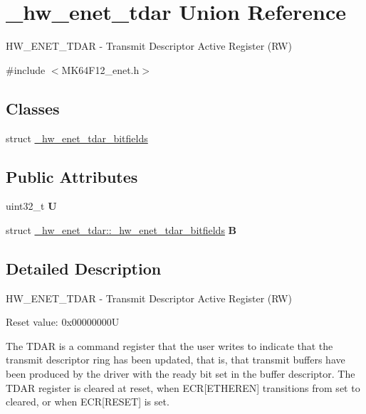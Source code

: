 \hypertarget{union__hw__enet__tdar}{}\section{\+\_\+hw\+\_\+enet\+\_\+tdar Union Reference}
\label{union__hw__enet__tdar}


H\+W\+\_\+\+E\+N\+E\+T\+\_\+\+T\+D\+AR -\/ Transmit Descriptor Active Register (RW)  




{\ttfamily \#include $<$M\+K64\+F12\+\_\+enet.\+h$>$}

\subsection*{Classes}
\begin{DoxyCompactItemize}
\item 
struct \hyperlink{struct__hw__enet__tdar_1_1__hw__enet__tdar__bitfields}{\+\_\+hw\+\_\+enet\+\_\+tdar\+\_\+bitfields}
\end{DoxyCompactItemize}
\subsection*{Public Attributes}
\begin{DoxyCompactItemize}
\item 
uint32\+\_\+t {\bfseries U}\hypertarget{union__hw__enet__tdar_a3fa9a50607c605f86243030ebfa4b5a1}{}\label{union__hw__enet__tdar_a3fa9a50607c605f86243030ebfa4b5a1}

\item 
struct \hyperlink{struct__hw__enet__tdar_1_1__hw__enet__tdar__bitfields}{\+\_\+hw\+\_\+enet\+\_\+tdar\+::\+\_\+hw\+\_\+enet\+\_\+tdar\+\_\+bitfields} {\bfseries B}\hypertarget{union__hw__enet__tdar_affa789dcd39e61413f4d1af2a24b5692}{}\label{union__hw__enet__tdar_affa789dcd39e61413f4d1af2a24b5692}

\end{DoxyCompactItemize}


\subsection{Detailed Description}
H\+W\+\_\+\+E\+N\+E\+T\+\_\+\+T\+D\+AR -\/ Transmit Descriptor Active Register (RW) 

Reset value\+: 0x00000000U

The T\+D\+AR is a command register that the user writes to indicate that the transmit descriptor ring has been updated, that is, that transmit buffers have been produced by the driver with the ready bit set in the buffer descriptor. The T\+D\+AR register is cleared at reset, when E\+CR\mbox{[}E\+T\+H\+E\+R\+EN\mbox{]} transitions from set to cleared, or when E\+CR\mbox{[}R\+E\+S\+ET\mbox{]} is set. 

